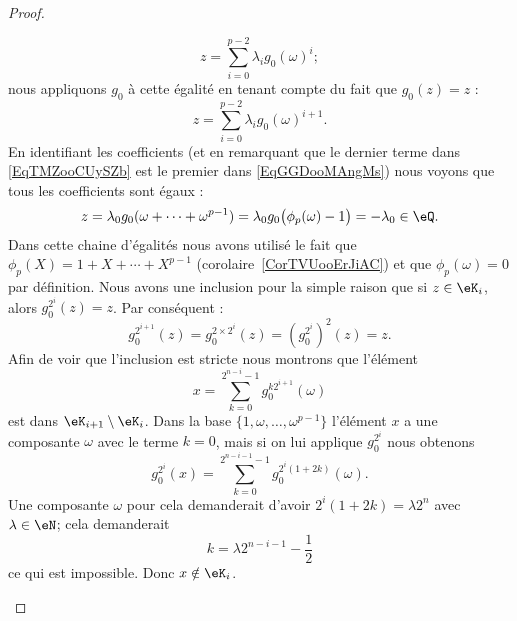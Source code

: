 \begin{proof}
\begin{subproof}
\begin{subproof}
			\begin{equation}    \label{EqTMZooCUySZb}
				z=\sum_{i=0}^{p-2}\lambda_i g_0(\omega)^i;
			\end{equation}
			nous appliquons \( g_0\) à cette égalité en tenant compte du fait que \( g_0(z)=z\) :
			\begin{equation}    \label{EqGGDooMAngMs}
				z=\sum_{i=0}^{p-2}\lambda_ig_0(\omega)^{i+1}.
			\end{equation}
			En identifiant les coefficients (et en remarquant que le dernier terme dans \eqref{EqTMZooCUySZb} est le premier dans \eqref{EqGGDooMAngMs}) nous voyons que tous les coefficients sont égaux :
			\begin{equation}
				z=\lambda_0g_0(\omega+\cdots +\omega^{p-1})=\lambda_0g_0\big( \phi_p(\omega)-1 \big)=-\lambda_0\in \eQ.
			\end{equation}
			Dans cette chaine d'égalités nous avons utilisé le fait que \( \phi_p(X)=1+X+\cdots +X^{p-1}\) (corolaire~\ref{CorTVUooErJiAC}) et que \( \phi_p(\omega)=0\) par définition.
			Nous avons une inclusion pour la simple raison que si \( z\in \eK_i\), alors \( g_0^{2^i}(z)=z\). Par conséquent :
			\begin{equation}
				g_0^{2^{i+1}}(z)=g_0^{2\times 2^i}(z)=(g_0^{2^i})^2(z)=z.
			\end{equation}
			Afin de voir que l'inclusion est stricte nous montrons que l'élément
			\begin{equation}\label{EqTBLooWpeGgk}
				x=\sum_{k=0}^{2^{n-i}-1}g_0^{k2^{i+1}}(\omega)
			\end{equation}
			est dans \( \eK_{i+1}\setminus \eK_i\). Dans la base \( \{ 1,\omega,\ldots, \omega^{p-1} \}\) l'élément \( x\) a une composante \( \omega\) avec le terme \( k=0\), mais si on lui applique \( g_0^{2^i}\) nous obtenons
			\begin{equation}
				g_0^{2^i}(x)=\sum_{k=0}^{2^{n-i-1}-1}g_0^{2^i(1+2k)}(\omega).
			\end{equation}
			Une composante \( \omega\) pour cela demanderait d'avoir \( 2^i(1+2k)=\lambda 2^n\) avec \( \lambda\in \eN\); cela demanderait
			\begin{equation}
				k=\lambda 2^{n-i-1}-\frac{ 1 }{2}
			\end{equation}
			ce qui est impossible. Donc \( x\notin \eK_{i}\).


\end{subproof}
\end{subproof}
\end{proof}
